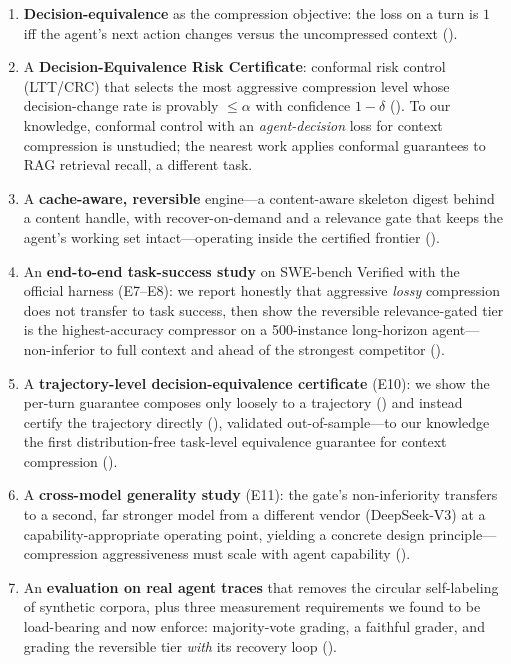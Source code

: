 \documentclass[11pt]{article}
\begin{document}
\begin{enumerate}
  \item \textbf{Decision-equivalence} as the compression objective: the loss on a
  turn is $1$ iff the agent's next action changes versus the uncompressed context
  ().
  \item A \textbf{Decision-Equivalence Risk Certificate}: conformal risk control
  (LTT/CRC) that selects the most aggressive compression level whose decision-change
  rate is provably $\le \alpha$ with confidence $1-\delta$ (). To
  our knowledge, conformal control with an \emph{agent-decision} loss for context
  compression is unstudied; the nearest work applies conformal guarantees to RAG
  retrieval recall, a different task.
  \item A \textbf{cache-aware, reversible} engine---a content-aware skeleton digest
  behind a content handle, with recover-on-demand and a relevance gate that keeps the
  agent's working set intact---operating inside the certified frontier ().
  \item An \textbf{end-to-end task-success study} on SWE-bench Verified with the official
  harness (E7--E8): we report honestly that aggressive \emph{lossy} compression does not
  transfer to task success, then show the reversible relevance-gated tier is the
  highest-accuracy compressor on a 500-instance long-horizon agent---non-inferior to full
  context and ahead of the strongest competitor ().
  \item A \textbf{trajectory-level decision-equivalence certificate} (E10): we show the
  per-turn guarantee composes only loosely to a trajectory () and instead
  certify the trajectory directly (), validated out-of-sample---to our
  knowledge the first distribution-free task-level equivalence guarantee for context
  compression ().
  \item A \textbf{cross-model generality study} (E11): the gate's non-inferiority transfers
  to a second, far stronger model from a different vendor (DeepSeek-V3) at a
  capability-appropriate operating point, yielding a concrete design principle---compression
  aggressiveness must scale with agent capability ().
  \item An \textbf{evaluation on real agent traces} that removes the circular
  self-labeling of synthetic corpora, plus three measurement requirements we found
  to be load-bearing and now enforce: majority-vote grading, a faithful grader, and
  grading the reversible tier \emph{with} its recovery loop ().
\end{enumerate}
\end{document}

